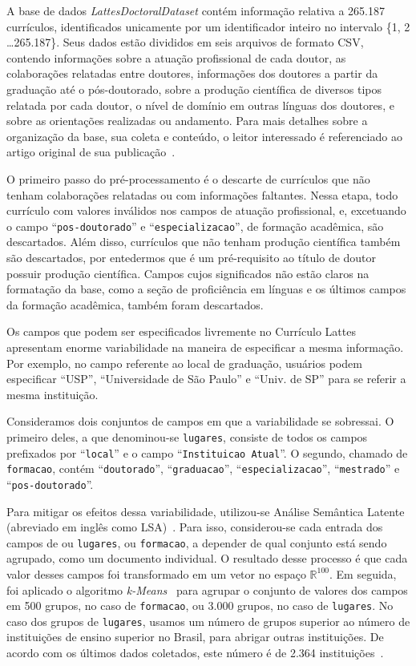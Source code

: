 \documentclass[12pt]{article}
\begin{document}
A base de dados \emph{LattesDoctoralDataset} contém informação relativa a 265.187 currículos, identificados unicamente por um identificador inteiro no intervalo \{1, 2 \dots 265.187\}.
Seus dados estão divididos em seis arquivos de formato CSV, contendo informações sobre a atuação profissional de cada doutor, as colaborações relatadas entre doutores, informações dos doutores a partir da graduação até o pós-doutorado, sobre a produção científica de diversos tipos relatada por cada doutor, o nível de domínio em outras línguas dos doutores, e sobre as orientações realizadas ou andamento.
Para mais detalhes sobre a organização da base, sua coleta e conteúdo, o leitor interessado é referenciado ao artigo original de sua publicação~\cite{lattes-dataset}.

O primeiro passo do pré-processamento é o descarte de currículos que não tenham colaborações relatadas ou com informações faltantes.
Nessa etapa, todo currículo com valores inválidos nos campos de atuação profissional, e, excetuando o campo ``\texttt{pos-doutorado}'' e ``\texttt{especializacao}'', de formação acadêmica, são descartados.
Além disso, currículos que não tenham produção científica também são descartados, por entedermos que é um pré-requisito ao título de doutor possuir produção científica.
Campos cujos significados não estão claros na formatação da base, como a seção de proficiência em línguas e os últimos campos da formação acadêmica, também foram descartados.

Os campos que podem ser especificados livremente no Currículo Lattes apresentam enorme variabilidade na maneira de especificar a mesma informação.
Por exemplo, no campo referente ao local de graduação, usuários podem especificar ``USP'', ``Universidade de São Paulo'' e ``Univ. de SP'' para se referir a mesma instituição.

Consideramos dois conjuntos de campos em que a variabilidade se sobressai.
O primeiro deles, a que denominou-se \texttt{lugares}, consiste de todos os campos prefixados por ``\texttt{local}'' e o campo ``\texttt{Instituicao Atual}''.
O segundo, chamado de \texttt{formacao}, contém ``\texttt{doutorado}'', ``\texttt{graduacao}'', ``\texttt{especializacao}'', ``\texttt{mestrado}'' e ``\texttt{pos-doutorado}''.

Para mitigar os efeitos dessa variabilidade, utilizou-se Análise Semântica Latente (abreviado em inglês como LSA)~\cite{lsa}.
Para isso, considerou-se cada entrada dos campos de ou \texttt{lugares}, ou \texttt{formacao}, a depender de qual conjunto está sendo agrupado, como um documento individual.
O resultado desse processo é que cada valor desses campos foi transformado em um vetor no espaço $\mathbb{R}^{100}$.
Em seguida, foi aplicado o algoritmo \emph{k-Means}~\cite{k-means} para agrupar o conjunto de valores dos campos em 500 grupos, no caso de \texttt{formacao}, ou 3.000 grupos, no caso de \texttt{lugares}.
No caso dos grupos de \texttt{lugares}, usamos um número de grupos superior ao número de instituições de ensino superior no Brasil, para abrigar outras instituições.
De acordo com os últimos dados coletados, este número é de 2.364 instituições~\cite{censo-mec}.
\end{document}
